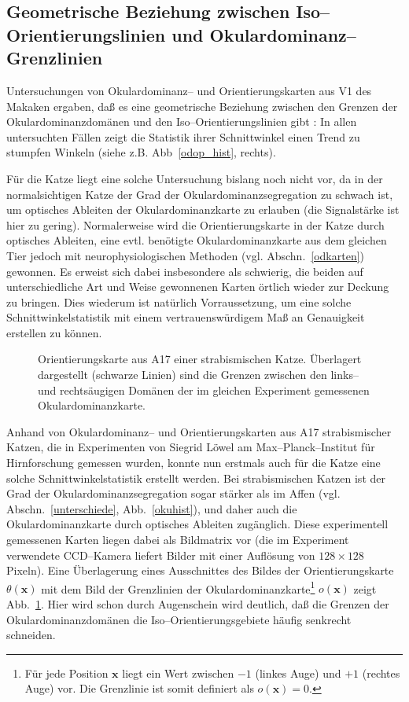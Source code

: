 \subsection[Geometrische Beziehung zwischen
Iso--Orientierungslinien$\ldots$]{Geometrische Beziehung zwischen
Iso--Orientierungslinien und Oku\-lar\-do\-minanz--Grenzlinien}
\label{90grad}

Untersuchungen von Okulardominanz-- und Orientierungskarten aus V1 des
Makaken ergaben, daß es eine geometrische Beziehung zwischen den Grenzen
der Okulardominanzdomänen und den Iso--Orientierungslinien gibt
\cite{bartfield:1992,oby:1993b}: In allen untersuchten Fällen zeigt die
Statistik ihrer Schnittwinkel einen Trend zu stumpfen Winkeln (siehe
z.B. Abb~\ref{odop_hist}, rechts).

Für die Katze liegt eine solche Untersuchung bislang noch nicht vor, da in
der normalsichtigen Katze der Grad der Okulardominanzsegregation zu schwach
ist, um optisches Ableiten der Okulardominanzkarte zu erlauben (die
Signalstärke ist hier zu gering). Normalerweise wird die
Orientierungskarte in der Katze durch optisches Ableiten, eine
evtl. benötigte Okulardominanzkarte aus dem gleichen Tier jedoch mit
neurophysiologischen Methoden (vgl. Abschn.~\ref{odkarten}) gewonnen. Es
erweist sich dabei insbesondere als schwierig, die beiden auf
unterschiedliche Art und Weise gewonnenen Karten örtlich wieder zur
Deckung zu bringen. Dies wiederum ist natürlich Vorraussetzung, um eine
solche Schnittwinkelstatistik mit einem vertrauenswürdigem Maß an
Genauigkeit erstellen zu können.

\begin{figure}[t]
\centering
{}
\caption{Orientierungskarte aus A17 einer strabismischen Katze. Überlagert
dargestellt (schwarze Linien) sind die Grenzen zwischen den links-- und
rechtsäugigen Domänen der im gleichen Experiment gemessenen
Okulardominanzkarte.}
\label{odop_pict}
\end{figure}

Anhand von Okulardominanz-- und Orientierungskarten aus A17 strabismischer
Katzen, die in Experimenten von Siegrid Löwel am Max--Planck--Institut
für Hirnforschung gemessen wurden, konnte nun erstmals auch für die Katze
eine solche Schnittwinkelstatistik erstellt werden. Bei strabismischen
Katzen ist der Grad der Okulardominanzsegregation sogar stärker als im
Affen (vgl. Abschn.~\ref{unterschiede}, Abb.~\ref{okuhist}), und daher auch
die Okulardominanzkarte durch optisches Ableiten zugänglich. Diese
experimentell gemessenen Karten liegen dabei als Bildmatrix vor (die im
Experiment verwendete CCD--Kamera liefert Bilder mit einer Auflösung von
$128\times 128$ Pixeln). Eine Überlagerung eines Ausschnittes des Bildes
der Orientierungskarte $\theta(\mathbf{x})$ mit dem Bild der Grenzlinien
der Okulardominanzkarte\footnote{Für jede Position $\mathbf{x}$ liegt ein
Wert zwischen $-1$ (linkes Auge) und $+1$ (rechtes Auge) vor. Die
Grenzlinie ist somit definiert als $o(\mathbf{x}) = 0$.} $o(\mathbf{x})$
zeigt Abb.~\ref{odop_pict}. Hier wird schon durch Augenschein wird
deutlich, daß die Grenzen der Okulardominanzdomänen die
Iso--Orientierungsgebiete häufig senkrecht schneiden.
\setcounter{footnote}{1}

